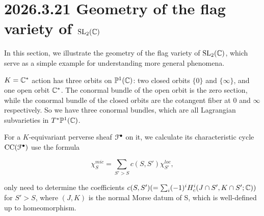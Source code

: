 \documentclass[12pt]{amsart}
\numberwithin{equation}{section}
\newcommand{\BP}{{\mathbb {P}}} \newcommand{\BQ}{{\mathbb {Q}}} \newcommand{\BR}{{\mathbb {R}}}
\begin{document}
\section{2026.3.21 Geometry of the flag variety of $\mathrm{SL}_2({\mathbb {C}})$}

In this section, we illustrate the geometry of the flag variety of $\mathrm{SL}_2({\mathbb {C}})$, which serve as a simple example for understanding more general phenomena. 


$K = {\mathbb {C}}^*$ action has three orbits on $\BP^1(\BC)$: two closed orbits $\{0\}$ and $\{\infty\}$, and one open orbit ${\mathbb {C}}^*$. The conormal bundle of the open orbit is the zero section, while the conormal bundle of the closed orbits are the cotangent fiber at $0$ and $\infty$ respectively. So we have three conormal bundles, which are all Lagrangian subvarieties in $T^*\BP^1(\BC)$.



\begin{center}
\end{center}

For a $K$-equivariant perverse sheaf ${\mathcal {F}}^{\bullet}$ on it, we calculate its characteristic cycle $\mathrm{CC}({\mathcal {F}}^{\bullet})$ use the formula

\[
\chi^{mic}_{S} = \sum_{S' > S} c(S,S') \chi^{loc}_{S'},
\]


only need to determine the coefficients $c(S,S') (= \sum_i (-1)^i H^i_c(J \cap S', K \cap S'; {\mathbb {C}}))$ for $S' > S$, where $(J,K)$ is the normal Morse datum of S, which is well-defined up to homeomorphism.
\end{document}
